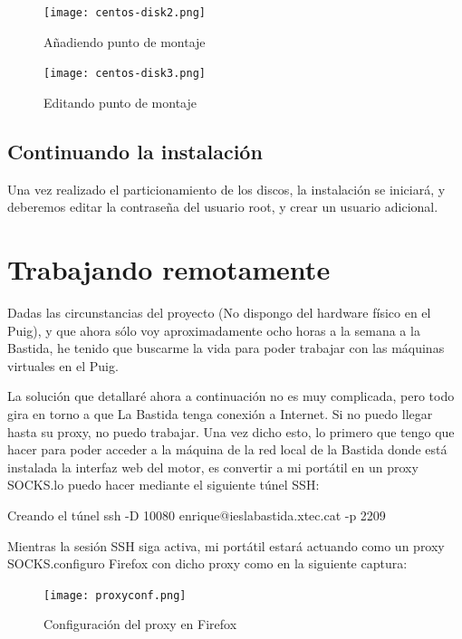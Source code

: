 \begin{figure}[ht!]
  \centering
  \texttt{[image: centos-disk2.png]}
  \caption{\label{fig:add_mpoint} Añadiendo punto de montaje}
\end{figure}

\begin{figure}[ht!]
  \centering
  \texttt{[image: centos-disk3.png]}
  \caption{\label{fig:edit_mpoint} Editando punto de montaje}
\end{figure}

\clearpage

\subsection{Continuando la instalación}
\label{subsec:continuando}

Una vez realizado el particionamiento de los discos, la instalación se iniciará, y deberemos editar la contraseña del usuario root, y crear un usuario adicional. 


\section{Trabajando remotamente}
\label{sec:remote}

Dadas las circunstancias del proyecto (No dispongo del hardware físico en el Puig), y que ahora sólo voy aproximadamente ocho horas a la semana a la Bastida, he tenido que buscarme la vida para poder trabajar con las máquinas virtuales en el Puig.

La solución que detallaré ahora a continuación no es muy complicada, pero todo gira en torno a que La Bastida tenga conexión a Internet. Si no puedo llegar hasta su proxy, no puedo trabajar. Una vez dicho esto, lo primero que tengo que hacer para poder acceder a la máquina de la red local de la Bastida donde está instalada la interfaz web del motor, es convertir a mi portátil en un proxy SOCKS. lo puedo hacer mediante el siguiente túnel SSH:

\begin{TMterminal}{}{}{Creando el túnel}
  ssh -D 10080 enrique@ieslabastida.xtec.cat -p 2209
\end{TMterminal}

Mientras la sesión SSH siga activa, mi portátil estará actuando como un proxy SOCKS.\@Si configuro Firefox con dicho proxy como en la siguiente captura: 

\begin{figure}[ht!]
  \centering
  \texttt{[image: proxyconf.png]}
  \caption{\label{fig:Proxy} Configuración del proxy en Firefox}
\end{figure}

